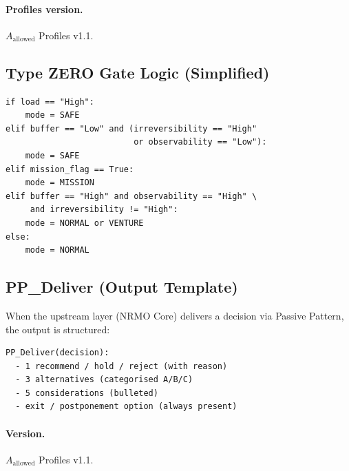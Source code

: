 \paragraph{Profiles version.}
$A_{\mathrm{allowed}}$ Profiles v1.1.

\subsection{Type ZERO Gate Logic (Simplified)}
\label{sec:a-allowed-gate-logic-c2}

\begin{lstlisting}[basicstyle=\ttfamily\small,frame=single]
if load == "High":
    mode = SAFE
elif buffer == "Low" and (irreversibility == "High"
                          or observability == "Low"):
    mode = SAFE
elif mission_flag == True:
    mode = MISSION
elif buffer == "High" and observability == "High" \
     and irreversibility != "High":
    mode = NORMAL or VENTURE
else:
    mode = NORMAL
\end{lstlisting}

\subsection{PP\_Deliver (Output Template)}
\label{sec:pp-deliver-template-c2}

When the upstream layer (NRMO Core) delivers a decision via Passive
Pattern, the output is structured:

\begin{lstlisting}[basicstyle=\ttfamily\small,frame=single]
PP_Deliver(decision):
  - 1 recommend / hold / reject (with reason)
  - 3 alternatives (categorised A/B/C)
  - 5 considerations (bulleted)
  - exit / postponement option (always present)
\end{lstlisting}

\paragraph{Version.}
$A_{\mathrm{allowed}}$ Profiles v1.1.
